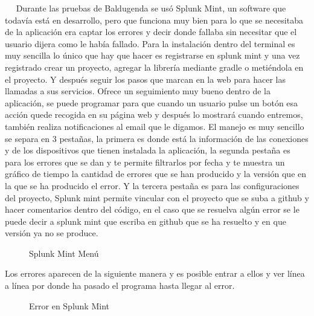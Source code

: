  
Durante las pruebas de Baldugenda se usó Splunk Mint, un software que todavía está en desarrollo, pero que funciona muy bien para lo que se necesitaba de la aplicación era captar los errores y decir donde fallaba sin necesitar que el usuario dijera como le había fallado.
Para la instalación dentro del terminal es muy sencilla lo único que hay que hacer es registrarse en splunk mint y una vez registrado crear un proyecto, agregar la librería mediante gradle o metiéndola en el proyecto.
Y después seguir los pasos que marcan en la web para hacer las llamadas a sus servicios.
Ofrece un seguimiento muy bueno dentro de la aplicación, se puede programar para que cuando un usuario pulse un botón esa acción quede recogida en su página web y después lo mostrará cuando entremos, también realiza notificaciones al email que le digamos.
El manejo es muy sencillo se separa en 3 pestañas, la primera es donde está la información de las conexiones y de los dispositivos que tienen instalada la aplicación, la segunda pestaña es para los errores que se dan y te permite filtrarlos por fecha y te muestra un gráfico de tiempo la cantidad de errores que se han producido y la versión que en la que se ha producido el error. Y la tercera pestaña es para las configuraciones del proyecto, Splunk mint permite vincular con el proyecto que se suba a github y hacer comentarios dentro del código, en el caso que se resuelva algún error se le puede decir a splunk mint que escriba en github que se ha resuelto y en que versión ya no se produce.

\begin{figure}[H] 
  \begin{center} 
    \caption{Splunk Mint Menú} 
    \label{fig:SplunkMintMenu} 
  \end{center} 
\end{figure}

Los errores aparecen de la siguiente manera y es posible entrar a ellos y ver línea a línea por donde ha pasado el programa hasta llegar al error.

\begin{figure}[H] 
  \begin{center} 
    \caption{Error en Splunk Mint} 
    \label{fig:ErrorSplunkMint} 
  \end{center} 
\end{figure}

